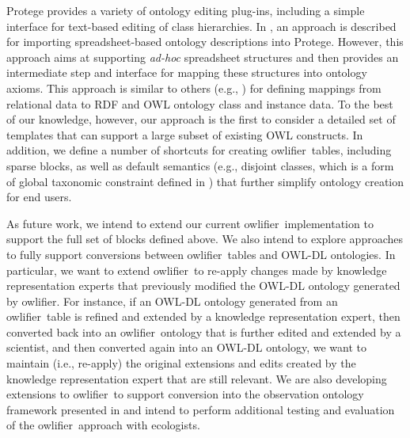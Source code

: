 \documentclass[preprint,number]{elsarticle}
\newcommand{\owlifier}{\textsf{owlifier}}
\begin{document}
Protege provides a variety of ontology editing plug-ins, including a
simple interface for text-based editing of class hierarchies. In
\cite{kola07:_impor_spread_data_into_proteg}, an approach is described
for importing spreadsheet-based ontology descriptions into
Protege. However, this approach aims at supporting \emph{ad-hoc}
spreadsheet structures and then provides an intermediate step and
interface for mapping these structures into ontology axioms. This
approach is similar to others (e.g.,
\cite{han08:_rdf12,bizer03:_d2r_map,an06:_discov_seman_of_relat_tables_throug_mappin})
for defining mappings from relational data to RDF and OWL ontology
class and instance data. To the best of our knowledge, however, our
approach is the first to consider a detailed set of templates that can
support a large subset of existing OWL constructs. In addition, we
define a number of shortcuts for creating \owlifier\ tables, including
sparse blocks, as well as default semantics (e.g., disjoint classes,
which is a form of global taxonomic constraint defined in
\cite{thau07:_reason_about_taxon_in_first_order_logi}) that further
simplify ontology creation for end users.

As future work, we intend to extend our current \owlifier\
implementation to support the full set of blocks defined above. We
also intend to explore approaches to fully support conversions between
\owlifier\ tables and OWL-DL ontologies. In particular, we want to
extend \owlifier\ to re-apply changes made by knowledge representation
experts that previously modified the OWL-DL ontology generated by
\owlifier. For instance, if an OWL-DL ontology generated from an
\owlifier\ table is refined and extended by a knowledge representation
expert, then converted back into an \owlifier\ ontology that is
further edited and extended by a scientist, and then converted again
into an OWL-DL ontology, we want to maintain (i.e., re-apply) the
original extensions and edits created by the knowledge representation
expert that are still relevant. We are also developing extensions to
\owlifier\ to support conversion into the observation ontology
framework presented in \cite{bowers08:_concep_model_framew_for_expres}
and intend to perform additional testing and evaluation of the
\owlifier\ approach with ecologists.

%


\end{document}
